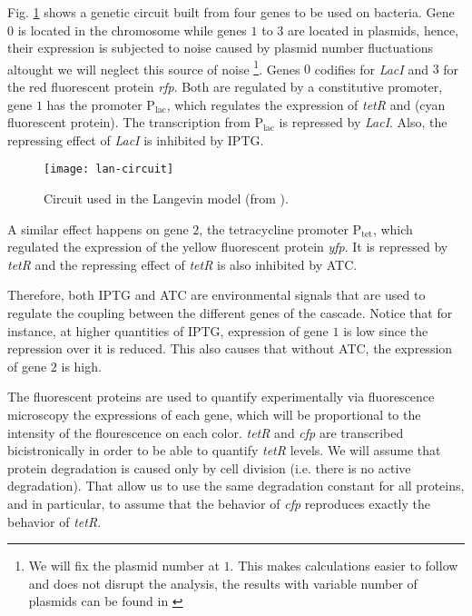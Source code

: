 Fig. \ref{fig:lan-circuit} shows a genetic circuit built from four genes to be used on bacteria. Gene $0$ is located in the chromosome while genes $1$ to $3$ are located in plasmids, hence, their expression is subjected to noise caused by plasmid number fluctuations altought we will neglect this source of noise \footnote{We will fix the plasmid number at $1$. This makes calculations easier to follow and does not disrupt the analysis, the results with variable number of plasmids can be found in \cite{pedraza05}}. Genes $0$ codifies for \textit{LacI} and $3$ for the red fluorescent protein \textit{rfp}. Both are regulated by a constitutive promoter, gene $1$ has the promoter P$_\text{lac}$, which regulates the expression of \textit{tetR} and  (cyan fluorescent protein). The transcription from P$_\text{lac}$ is repressed by \textit{LacI}. Also, the repressing effect of \textit{LacI} is inhibited by IPTG.

\begin{figure}[H]
  \centering
  \texttt{[image: lan-circuit]}
  \caption[Circuit used for the Langevin model]{\label{fig:lan-circuit} Circuit used in the Langevin model (from \cite{pedraza05}).}
\end{figure}

A similar effect happens on gene $2$, the tetracycline promoter P$_\text{tet}$, which regulated the expression of the yellow fluorescent protein \textit{yfp}. It is repressed by \textit{tetR} and the repressing effect of \textit{tetR} is also inhibited by ATC.

Therefore, both IPTG and ATC are environmental signals that are used to regulate the coupling between the different genes of the cascade. Notice that for instance, at higher quantities of IPTG, expression of gene $1$ is low since the repression over it is reduced. This also causes that without ATC, the expression of gene $2$ is high. 

The fluorescent proteins are used to quantify experimentally via fluorescence microscopy the expressions of each gene, which will be proportional to the intensity of the flourescence on each color. \textit{tetR} and \textit{cfp} are transcribed bicistronically in order to be able to quantify \textit{tetR} levels. We will assume that protein degradation is caused only by cell division (i.e. there is no active degradation). That allow us to use the same degradation constant for all proteins, and in particular, to assume that the behavior of \textit{cfp} reproduces exactly the behavior of \textit{tetR}. 

